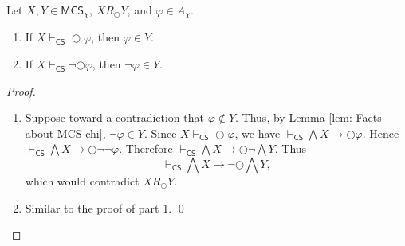 \documentclass[envcountsect,envcountsame,oribibl,orivec]{llncs}
\newcommand{\lnext}{\bigcirc}
\newcommand{\CS}{\textsf{CS}}
\renewcommand{\phi}{\varphi}
\newcommand{\MCS}{\mathsf{MCS}}
\begin{document}
\begin{lemma}\label{lem:corollary of R-next}
	Let $X,Y \in \MCS_\chi$, $X R_\lnext Y$, and $\phi \in A_\chi$.
	
	\begin{enumerate}
		\item  If\/ $X \vdash_\CS \lnext \phi$, then $\phi \in Y$.
		
		\item  If\/ $X \vdash_\CS \neg \lnext \phi$, then $\neg \phi \in Y$.
	\end{enumerate}
\end{lemma}
\begin{proof}
	\begin{enumerate}
		\item 
		Suppose toward a contradiction that $\phi \not \in Y$. Thus, by Lemma \ref{lem: Facts about MCS-chi}, $\neg \phi \in Y$. Since $X \vdash_\CS \lnext \phi$, we have
		\mbox{$
			\vdash_\CS \bigwedge X \to \lnext \phi.
			$}
		Hence 
		$
		\vdash_\CS \bigwedge X \to \lnext \neg\neg \phi.
		$
		Therefore 
		$\vdash_\CS \bigwedge X \to \lnext \neg \bigwedge Y.
		$
		Thus 
		\[
		\vdash_\CS \bigwedge X \to \neg \lnext  \bigwedge Y,
		\]
		which would contradict $X R_\lnext Y$.
		
		\item Similar to the proof of part 1.    \qed
	\end{enumerate}
\end{proof}
\end{document}
